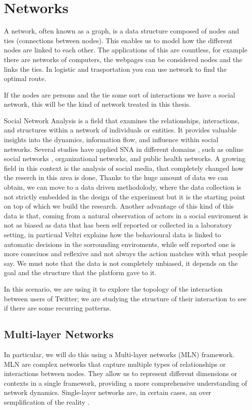 \section[Networks]{Networks}

A network,  often known as a graph, is a data structure composed of nodes and ties (connections between nodes). This enables us to model how the different nodes are linked to each other. The applications of this are countless, for example there are networks of computers, the webpages can be considered nodes and the links the ties. In logistic and trasportation you can use network to find the optimal route.

If the nodes are persons and the tie some sort of interactions we have a social network, this will be the kind of network treated in this thesis.


Social Network Analysis is a field that examines the relationships, interactions, and structures within a network of individuals or entities. It provides valuable insights into the dynamics, information flow, and influence within social networks. Several studies have applied SNA in different domains \cite{borgatti_network_2009}, such as online social networks , organizational networks, and public health networks. A growing field in this context is the analysis of social media, that completely changed how the reserch in this area is done, Thanks to the huge amount of data we can obtain, we can move to a data driven methodolody, where the data collection is not strictly embedded in the design of the experiment but it is the starting point on top of which we build the research. Another advantage of this kind of this data is that, coming from a natural observation of actors in a social enviroment is not as biased as data that has been self reported or collected in a laboratory setting, in particual Veltri \cite{digital_veltri_2019} explains how the behavioural data is linked to automatic decisions in the sorrounding enviroments, while self reported one is more consciuos and reflexive and not always the action matches with what people say. We must note that the data is not completely unbiased, it depends on the goal and the structure that the platform gave to it.

In this scenario, we are using it to explore the topology of the interaction between users of Twitter; we are studying the structure of their interaction to see if there are some recurring patterns.

\subsection{Multi-layer Networks}
In particular, we will do this using a Multi-layer networks (MLN) framework\cite{kivela_multilayer_2014}. MLN are complex networks that capture multiple types of relationships or interactions between nodes. They allow us to represent different dimensions or contexts in a single framework, providing a more comprehensive understanding of network dynamics.
Single-layer networks are, in certain cases, an over semplification of the reality\cite{trax_multilayer_16} \cite{hammoud_multilayer_2020}.

